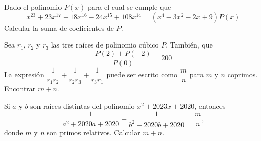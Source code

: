     \begin{section-problem}
        Dado el polinomio $P(x)$ para el cual se cumple que
        \[x^{23} + 23x^{17} - 18x^{16} - 24x^{15} + 108x^{14} = (x^4 - 3x^2 - 2x + 9)P(x)\]
        Calcular la suma de coeficientes de $P$.
    \end{section-problem}

    \begin{section-problem}
        Sea $r_1$, $r_2$ y $r_3$ las tres raíces de polinomio cúbico $P$.
        También, que
        \[\frac{P(2) + P(-2)}{P(0)} = 200\]
        La expresión $\dfrac{1}{r_1 r_2} + \dfrac{1}{r_2 r_3} + \dfrac{1}{r_3 r_1}$ puede ser escrito como $\dfrac{m}{n}$ para $m$ y $n$ coprimos.
        Encontrar $m + n$.
    \end{section-problem}

    \begin{section-problem}
        Si $a$ y $b$ son raíces distintas del polinomio $x^2 + 2023x + 2020$, entonces
        \[\frac{1}{a^2 + 2020a + 2020} + \frac{1}{b^2 + 2020b + 2020} = \frac{m}{n},\]
        donde $m$ y $n$ son primos relativos.
        Calcular $m + n$.
    \end{section-problem}